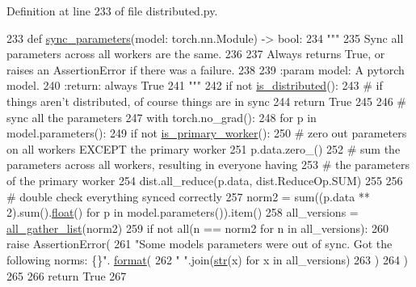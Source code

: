 Definition at line 233 of file distributed.\+py.


\begin{DoxyCode}
233 \textcolor{keyword}{def }\hyperlink{namespaceparlai_1_1utils_1_1distributed_a47e6d93d849e487d7d3f6e1a83468073}{sync\_parameters}(model: torch.nn.Module) -> bool:
234     \textcolor{stringliteral}{"""}
235 \textcolor{stringliteral}{    Sync all parameters across all workers are the same.}
236 \textcolor{stringliteral}{}
237 \textcolor{stringliteral}{    Always returns True, or raises an AssertionError if there was a failure.}
238 \textcolor{stringliteral}{}
239 \textcolor{stringliteral}{    :param model: A pytorch model.}
240 \textcolor{stringliteral}{    :return: always True}
241 \textcolor{stringliteral}{    """}
242     \textcolor{keywordflow}{if} \textcolor{keywordflow}{not} \hyperlink{namespaceparlai_1_1utils_1_1distributed_a023acb5e3b66e1f27e21247c35661279}{is\_distributed}():
243         \textcolor{comment}{# if things aren't distributed, of course things are in sync}
244         \textcolor{keywordflow}{return} \textcolor{keyword}{True}
245 
246     \textcolor{comment}{# sync all the parameters}
247     with torch.no\_grad():
248         \textcolor{keywordflow}{for} p \textcolor{keywordflow}{in} model.parameters():
249             \textcolor{keywordflow}{if} \textcolor{keywordflow}{not} \hyperlink{namespaceparlai_1_1utils_1_1distributed_a9bb1dac198180590ef8c6b6c6f9fc2c4}{is\_primary\_worker}():
250                 \textcolor{comment}{# zero out parameters on all workers EXCEPT the primary worker}
251                 p.data.zero\_()
252             \textcolor{comment}{# sum the parameters across all workers, resulting in everyone having}
253             \textcolor{comment}{# the parameters of the primary worker}
254             dist.all\_reduce(p.data, dist.ReduceOp.SUM)
255 
256     \textcolor{comment}{# double check everything synced correctly}
257     norm2 = sum((p.data ** 2).sum().\hyperlink{namespaceprojects_1_1controllable__dialogue_1_1make__control__dataset_aa2b7207688c641dbc094ab44eca27113}{float}() \textcolor{keywordflow}{for} p \textcolor{keywordflow}{in} model.parameters()).item()
258     all\_versions = \hyperlink{namespaceparlai_1_1utils_1_1distributed_a9ef5bf0debf512ddbeb045327bfd87ef}{all\_gather\_list}(norm2)
259     \textcolor{keywordflow}{if} \textcolor{keywordflow}{not} all(n == norm2 \textcolor{keywordflow}{for} n \textcolor{keywordflow}{in} all\_versions):
260         \textcolor{keywordflow}{raise} AssertionError(
261             \textcolor{stringliteral}{"Some models parameters were out of sync. Got the following norms: \{\}"}.
      \hyperlink{namespaceparlai_1_1chat__service_1_1services_1_1messenger_1_1shared__utils_a32e2e2022b824fbaf80c747160b52a76}{format}(
262                 \textcolor{stringliteral}{" "}.join(\hyperlink{namespacegenerate__task__READMEs_a5b88452ffb87b78c8c85ececebafc09f}{str}(x) \textcolor{keywordflow}{for} x \textcolor{keywordflow}{in} all\_versions)
263             )
264         )
265 
266     \textcolor{keywordflow}{return} \textcolor{keyword}{True}
267 \end{DoxyCode}
